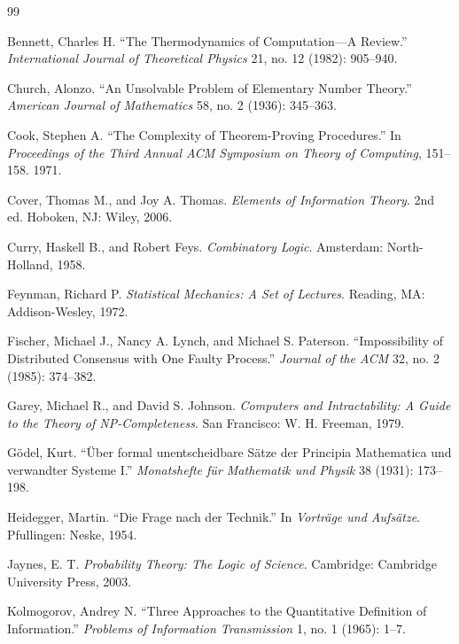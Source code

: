 \documentclass[11pt,openany]{book}
\begin{document}
\newpage
\begin{thebibliography}{99}

Bennett, Charles H. 
\newblock ``The Thermodynamics of Computation—A Review.''
\newblock \emph{International Journal of Theoretical Physics} 21, no. 12 (1982): 905--940.

Church, Alonzo.
\newblock ``An Unsolvable Problem of Elementary Number Theory.''
\newblock \emph{American Journal of Mathematics} 58, no. 2 (1936): 345--363.

Cook, Stephen A.
\newblock ``The Complexity of Theorem-Proving Procedures.''
\newblock In \emph{Proceedings of the Third Annual ACM Symposium on Theory of Computing}, 151--158. 1971.

Cover, Thomas M., and Joy A. Thomas.
\newblock \emph{Elements of Information Theory}.
\newblock 2nd ed. Hoboken, NJ: Wiley, 2006.

Curry, Haskell B., and Robert Feys.
\newblock \emph{Combinatory Logic}.
\newblock Amsterdam: North-Holland, 1958.

Feynman, Richard P.
\newblock \emph{Statistical Mechanics: A Set of Lectures}.
\newblock Reading, MA: Addison-Wesley, 1972.

Fischer, Michael J., Nancy A. Lynch, and Michael S. Paterson.
\newblock ``Impossibility of Distributed Consensus with One Faulty Process.''
\newblock \emph{Journal of the ACM} 32, no. 2 (1985): 374--382.

Garey, Michael R., and David S. Johnson.
\newblock \emph{Computers and Intractability: A Guide to the Theory of NP-Completeness}.
\newblock San Francisco: W. H. Freeman, 1979.

Gödel, Kurt.
\newblock ``Über formal unentscheidbare Sätze der Principia Mathematica und verwandter Systeme I.''
\newblock \emph{Monatshefte für Mathematik und Physik} 38 (1931): 173--198.

Heidegger, Martin.
\newblock ``Die Frage nach der Technik.''
\newblock In \emph{Vorträge und Aufsätze}. Pfullingen: Neske, 1954.

Jaynes, E. T.
\newblock \emph{Probability Theory: The Logic of Science}.
\newblock Cambridge: Cambridge University Press, 2003.

Kolmogorov, Andrey N.
\newblock ``Three Approaches to the Quantitative Definition of Information.''
\newblock \emph{Problems of Information Transmission} 1, no. 1 (1965): 1--7.


\end{thebibliography}
\end{document}

